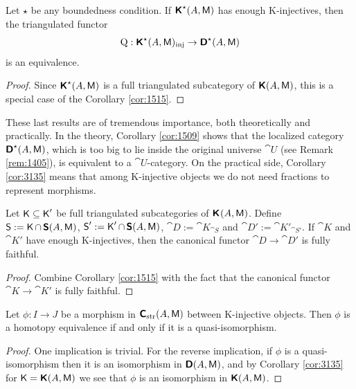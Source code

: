 \begin{cor} \label{cor:1509}
Let $\star$ be any boundedness condition. If $\boldsymbol{\mathsf{K}}^{\star}(A, \operatorname{\mathsf{M}})$ has 
enough K-injectives, then the triangulated functor
\[ \operatorname{Q} : \boldsymbol{\mathsf{K}}^{\star}(A, \operatorname{\mathsf{M}})_{\mathrm{inj}} \to
\boldsymbol{\mathsf{D}}^{\star}(A, \operatorname{\mathsf{M}}) \]
is an equivalence.
\end{cor}

\begin{proof}
Since $\boldsymbol{\mathsf{K}}^{\star}(A, \operatorname{\mathsf{M}})$ is a full 
triangulated subcategory of $\boldsymbol{\mathsf{K}}(A, \operatorname{\mathsf{M}})$,
this is a special case of the Corollary \ref{cor:1515}.
\end{proof}

\begin{rem} \label{rem:1511}
These last results are of tremendous importance, both theoretically and 
practically. In the theory, Corollary \ref{cor:1509}
shows that the localized category 
$\boldsymbol{\mathsf{D}}^{\star}(A, \operatorname{\mathsf{M}})$, 
which is too big to lie inside the original universe $\cat{U}$ (see Remark 
\ref{rem:1405}), is equivalent to a  $\cat{U}$-category. 
On the practical side, Corollary \ref{cor:3135} means that among K-injective 
objects we do not need fractions to represent morphisms. 
\end{rem}

\begin{cor} \label{cor:1511}
Let $\operatorname{\mathsf{K}} \subseteq \operatorname{\mathsf{K}}'$ be full triangulated subcategories of 
$\boldsymbol{\mathsf{K}}^{}(A, \operatorname{\mathsf{M}})$.
Define 
$\operatorname{\mathsf{S}} := \operatorname{\mathsf{K}} \cap \, \boldsymbol{\mathsf{S}}(A, \operatorname{\mathsf{M}})$,
$\operatorname{\mathsf{S}}' := \operatorname{\mathsf{K}}' \cap \, \boldsymbol{\mathsf{S}}(A, \operatorname{\mathsf{M}})$,
$\cat{D} := \cat{K}_{\cat{S}}$
and
$\cat{D}' := \cat{K}'_{\cat{S}'}$.
If $\cat{K}$ and $\cat{K}'$ have enough K-injectives, then the canonical 
functor $\cat{D} \to \cat{D}'$ is fully faithful. 
\end{cor}

\begin{proof}
Combine Corollary \ref{cor:1515} with the fact that the canonical functor
$\cat{K} \to \cat{K}'$ is fully faithful.
\end{proof}

\begin{cor} \label{cor:1922}
Let $\phi : I \to J$ be a morphism in $\boldsymbol{\mathsf{C}}_{\mathrm{str}}(A, \operatorname{\mathsf{M}})$ 
between K-injective objects. Then $\phi$ is a homotopy equivalence if and only 
if it is a quasi-isomorphism. 
\end{cor}

\begin{proof}
One implication is trivial. For the reverse implication, if $\phi$ is a 
quasi-isomorphism then it is an isomorphism in 
$\boldsymbol{\mathsf{D}}(A, \operatorname{\mathsf{M}})$, and by Corollary \ref{cor:3135} for 
$\operatorname{\mathsf{K}} = \boldsymbol{\mathsf{K}}(A, \operatorname{\mathsf{M}})$
we see that $\phi$ is an isomorphism in $\boldsymbol{\mathsf{K}}(A, \operatorname{\mathsf{M}})$. 
\end{proof}
   
